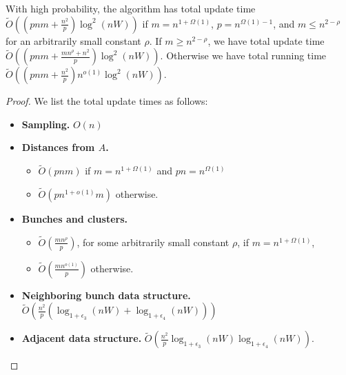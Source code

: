 \begin{lemma}\label{lm:mult_time}
    With high probability, the algorithm \DynAPSPtwo has total update time $ \tilde O ((pnm + \tfrac{n^2}{ p})\log^2(nW)) $ if $m=n^{1+\Omega(1)}$, $p=n^{\Omega(1)-1}$, and $m\leq n^{2-\rho}$ for an arbitrarily small constant $\rho$. If $m\geq n^{2-\rho}$, we have total update time $ \tilde O ((pnm + \tfrac{mn^ \rho+n^2}{ p})\log^2(nW)) $. Otherwise we have total running time $ \tilde O ((pnm + \tfrac{n^2}{ p})n^{o(1)}\log^2(nW)) $.
\end{lemma}
\begin{proof}
    We list the total update times as follows:
\begin{itemize}
    \item \textbf{Sampling.} $O(n)$
    \item \textbf{Distances from $A$.}
    \begin{itemize}
	\item $\tilde{O}(pnm)$ if $m=n^{1+\Omega(1)}$ and $pn=n^{\Omega(1)}$
	\item $\tilde O(pn^{1+o(1)}m)$ otherwise.
    \end{itemize}
    \item \textbf{Bunches and clusters.} 
    \begin{itemize}
	\item $ \tilde O (\tfrac{mn^\rho}{p}) $, for some arbitrarily small constant $\rho$, if $m=n^{1+\Omega(1)}$, 
	\item $\tilde O(\tfrac{mn^{o(1)}}{p})$ otherwise.
    \end{itemize}
   \item \textbf{Neighboring bunch data structure.} $ \tilde O (\tfrac{n^2}{p} (\log_{1+\epsilon_3}(nW)+\log_{1+\epsilon_4}(nW))) $
   \item \textbf{Adjacent data structure.} $ \tilde O (\tfrac{n^2}{p}\log_{1+\epsilon_3}(nW)\log_{1+\epsilon_4}(nW)) $.

\end{itemize}
\end{proof}
